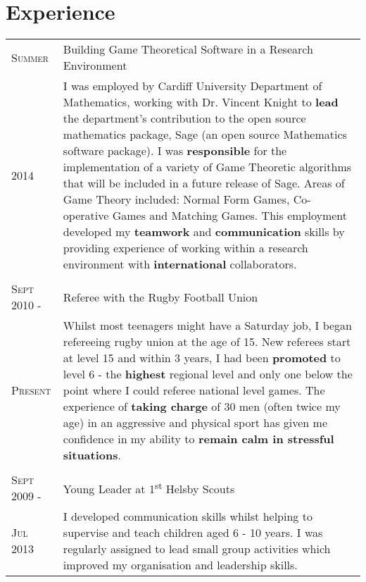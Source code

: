 \documentclass[a4paper]{article}
\begin{document}
\section{Experience}
\begin{tabularx}{\textwidth}{lX}

\textsc{Summer} & Building Game Theoretical Software in a Research Environment \\
\textsc{2014}& \footnotesize{I was employed by Cardiff University Department of Mathematics, working with Dr. Vincent Knight to \textbf{lead} the department's contribution to the open source mathematics package, Sage (an open source Mathematics software package).
I was \textbf{responsible} for the implementation of a variety of Game Theoretic algorithms that will be included in a future release of Sage.
Areas of Game Theory included: Normal Form Games, Co-operative Games and Matching Games.
This employment developed my \textbf{teamwork} and \textbf{communication} skills by providing experience of working within a research environment with \textbf{international} collaborators.}\\
\\
\textsc{Sept 2010 -} & Referee with the Rugby Football Union \\
\textsc{Present} & \footnotesize{Whilst most teenagers might have a Saturday job, I began refereeing rugby union at the age of 15.
New referees start at level 15 and within 3 years, I had been \textbf{promoted} to level 6 - the \textbf{highest} regional level and only one below the point where I could referee national level games.
The experience of \textbf{taking charge} of 30 men (often twice my age) in an aggressive and physical sport has given me confidence in my ability to \textbf{remain calm in stressful situations}.}\\
\\
\textsc{Sept 2009 -} & Young Leader at 1\textsuperscript{st} Helsby Scouts\\
\textsc{Jul 2013}& \footnotesize{I developed communication skills whilst helping to supervise and teach children aged 6 - 10 years.
I was regularly assigned to lead small group activities which improved my organisation and leadership skills.}\\

\end{tabularx}
\end{document}
